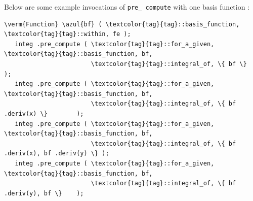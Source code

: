 Below are some example invocations of {\small\tt pre\_\,compute} with one basis function :
\begin{Verbatim}[commandchars=\\\{\},formatcom=\small\tt,
   baselinestretch=0.94,framesep=2mm                      ]
   \verm{Function} \azul{bf} ( \textcolor{tag}{tag}::basis_function, \textcolor{tag}{tag}::within, fe );
   integ .pre_compute ( \textcolor{tag}{tag}::for_a_given, \textcolor{tag}{tag}::basis_function, bf,
                        \textcolor{tag}{tag}::integral_of, \{ bf \}                  );
   integ .pre_compute ( \textcolor{tag}{tag}::for_a_given, \textcolor{tag}{tag}::basis_function, bf,
                        \textcolor{tag}{tag}::integral_of, \{ bf .deriv(x) \}        );
   integ .pre_compute ( \textcolor{tag}{tag}::for_a_given, \textcolor{tag}{tag}::basis_function, bf,
                        \textcolor{tag}{tag}::integral_of, \{ bf .deriv(x), bf .deriv(y) \} );
   integ .pre_compute ( \textcolor{tag}{tag}::for_a_given, \textcolor{tag}{tag}::basis_function, bf,
                        \textcolor{tag}{tag}::integral_of, \{ bf .deriv(y), bf \}    );
\end{Verbatim}

